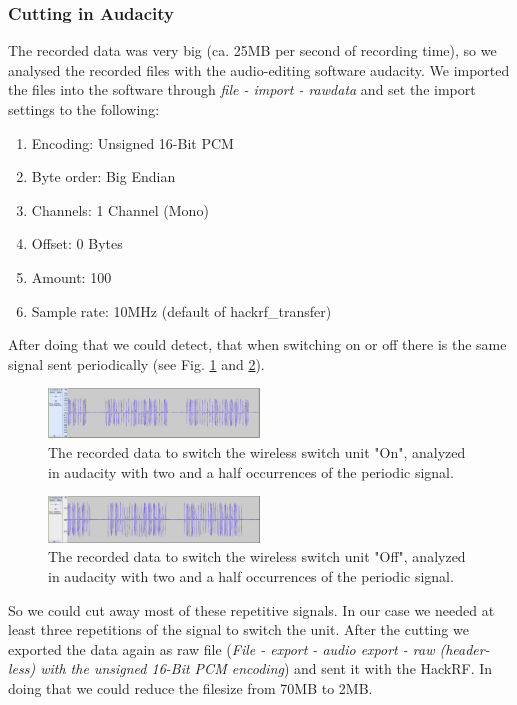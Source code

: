 \documentclass[conference]{IEEEtran}
\begin{document}
\subsubsection{Cutting in Audacity}
The recorded data was very big (ca. 25MB per second of recording time), so we analysed the recorded files with the audio-editing software audacity. We imported the files into the software through \textit{file - import - rawdata} and set the import settings to the following:

\begin{enumerate}
	\item Encoding: Unsigned 16-Bit PCM
	\item Byte order: Big Endian
	\item Channels: 1 Channel (Mono)
	\item Offset: 0 Bytes
	\item Amount: 100%
	\item Sample rate: 10MHz (default of hackrf\_transfer)
\end{enumerate}
\bigbreak
After doing that we could detect, that when switching on or off there is the same signal sent periodically (see Fig. \ref{fig:audacity_on} and \ref{fig:audacity_off}). 

\begin{figure}[H]
	\centering
	\includegraphics[width=0.5\textwidth]{audacity_received_on}
	\caption{The recorded data to switch the wireless switch unit "On", analyzed in audacity with two and a half occurrences of the periodic signal.}
	\label{fig:audacity_on}
\end{figure}

\begin{figure}[H]
	\centering
	\includegraphics[width=0.5\textwidth]{audacity_received_off}
	\caption{The recorded data to switch the wireless switch unit "Off", analyzed in audacity with two and a half occurrences of the periodic signal.}
	\label{fig:audacity_off}
\end{figure}

So we could cut away most of these repetitive signals. In our case we needed at least three repetitions of the signal to switch the unit. After the cutting we exported the data again as raw file (\textit{File - export - audio export - raw (header-less) with the unsigned 16-Bit PCM encoding}) and sent it with the HackRF. In doing that we could reduce the filesize from 70MB to 2MB.
\end{document}
